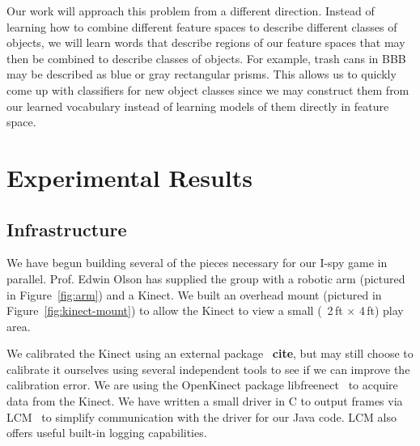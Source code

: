 \documentclass[11pt]{article}
\newcommand{\xxx}[1]{{\bf \color{red} #1}}
\begin{document}
Our work will approach this problem from a different direction. Instead of
learning how to combine different feature spaces to describe different classes
of objects, we will learn words that describe regions of our feature spaces that
may then be combined to describe classes of objects. For example, trash cans in
BBB may be described as blue or gray rectangular prisms. This allows us to quickly
come up with classifiers for new object classes since we may construct them from
our learned vocabulary instead of learning models of them directly in feature
space.


\section{Experimental Results}
\subsection{Infrastructure}
We have begun building several of the pieces necessary for our I-spy
game in parallel.  Prof. Edwin Olson has supplied the group with a robotic
arm (pictured in Figure~\ref{fig:arm}) and a Kinect.  We built an
overhead mount (pictured in Figure~\ref{fig:kinect-mount}) to allow the Kinect
to view a small (~2\,ft $\times$ 4\,ft) play area.

We calibrated the Kinect using an external package~\xxx{cite}, but may still
choose to calibrate it ourselves using several independent tools to see if we
can improve the calibration error. We are using the OpenKinect
package libfreenect~\cite{OpenKinect} to acquire data from the Kinect.  We have
written a small driver in C to output frames via LCM~\cite{huang2010} to simplify
communication with the driver for our Java code.  LCM also offers useful
built-in logging capabilities.
\end{document}
